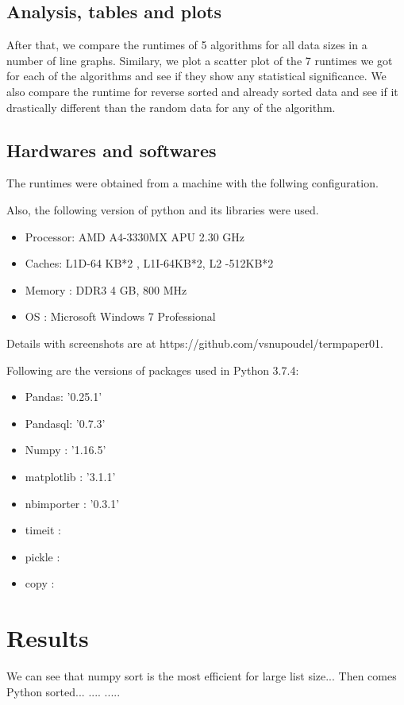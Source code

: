 \documentclass[sigconf, nonacm, natbib, screen, balance=False]{acmart}
\begin{document}
\subsection{Analysis, tables and plots}\label{sec:analysis}
After that, we compare the runtimes of 5 algorithms for all data sizes in a number of line graphs. Similary, we plot a scatter plot of the 7 runtimes 
we got for each of the algorithms and see if they show any statistical significance. We also compare the runtime for reverse sorted and already sorted
data and see if it drastically different than the random data for any of the algorithm.

\subsection{Hardwares and softwares}\label{sec:hardwares and softwares}
The runtimes were obtained from a machine with the follwing configuration. 

Also, the following version of python and its libraries were used.
\begin{itemize}
\item Processor:    AMD A4-3330MX APU  2.30 GHz
\item Caches:        L1D-64 KB*2 , L1I-64KB*2, L2 -512KB*2
\item Memory :      DDR3 4 GB, 800 MHz
\item OS :              Microsoft Windows 7 Professional
\end{itemize}
Details with screenshots are at https://github.com/vsnupoudel/termpaper01.

Following are the versions of packages used in Python 3.7.4:
\begin{itemize}
\item Pandas:    '0.25.1'
\item Pandasql:    '0.7.3'
\item Numpy :      '1.16.5'
\item matplotlib :          '3.1.1'
\item nbimporter :          '0.3.1'
\item timeit :         
\item pickle :       
\item copy :        
\end{itemize}


\section{Results}\label{sec:results}
We can see that numpy sort is the most efficient for large list size...
Then comes Python sorted...
....
.....
\end{document}
